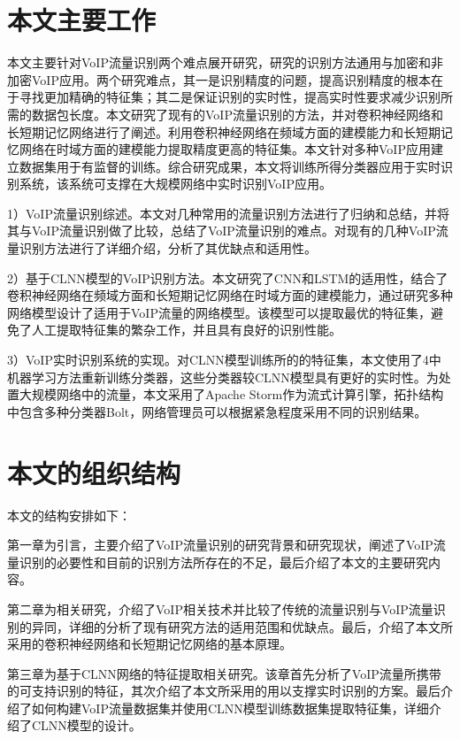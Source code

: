 \section{本文主要工作}

本文主要针对VoIP流量识别两个难点展开研究，研究的识别方法通用与加密和非加密VoIP应用。两个研究难点，其一是识别精度的问题，提高识别精度的根本在于寻找更加精确的特征集；其二是保证识别的实时性，提高实时性要求减少识别所需的数据包长度。本文研究了现有的VoIP流量识别的方法，并对卷积神经网络和长短期记忆网络进行了阐述。利用卷积神经网络在频域方面的建模能力和长短期记忆网络在时域方面的建模能力提取精度更高的特征集。本文针对多种VoIP应用建立数据集用于有监督的训练。综合研究成果，本文将训练所得分类器应用于实时识别系统，该系统可支撑在大规模网络中实时识别VoIP应用。

1）VoIP流量识别综述。本文对几种常用的流量识别方法进行了归纳和总结，并将其与VoIP流量识别做了比较，总结了VoIP流量识别的难点。对现有的几种VoIP流量识别方法进行了详细介绍，分析了其优缺点和适用性。

2）基于CLNN模型的VoIP识别方法。本文研究了CNN和LSTM的适用性，结合了卷积神经网络在频域方面和长短期记忆网络在时域方面的建模能力，通过研究多种网络模型设计了适用于VoIP流量的网络模型。该模型可以提取最优的特征集，避免了人工提取特征集的繁杂工作，并且具有良好的识别性能。

3）VoIP实时识别系统的实现。对CLNN模型训练所的的特征集，本文使用了4中机器学习方法重新训练分类器，这些分类器较CLNN模型具有更好的实时性。为处置大规模网络中的流量，本文采用了Apache Storm作为流式计算引擎，拓扑结构中包含多种分类器Bolt，网络管理员可以根据紧急程度采用不同的识别结果。

\section{本文的组织结构}
本文的结构安排如下：

第一章为引言，主要介绍了VoIP流量识别的研究背景和研究现状，阐述了VoIP流量识别的必要性和目前的识别方法所存在的不足，最后介绍了本文的主要研究内容。

第二章为相关研究，介绍了VoIP相关技术并比较了传统的流量识别与VoIP流量识别的异同，详细的分析了现有研究方法的适用范围和优缺点。最后，介绍了本文所采用的卷积神经网络和长短期记忆网络的基本原理。

第三章为基于CLNN网络的特征提取相关研究。该章首先分析了VoIP流量所携带的可支持识别的特征，其次介绍了本文所采用的用以支撑实时识别的方案。最后介绍了如何构建VoIP流量数据集并使用CLNN模型训练数据集提取特征集，详细介绍了CLNN模型的设计。

